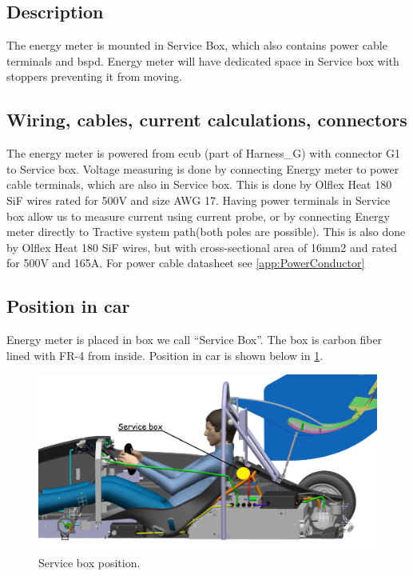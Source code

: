 \subsection{Description}

The energy meter is mounted in Service Box, which also contains power cable terminals and \gls{bspd}. Energy meter will have dedicated space in Service box with stoppers preventing it from moving. 

\subsection{Wiring, cables, current calculations, connectors}

The energy meter is powered from \gls{ecub} (part of Harness\_G) with connector G1 to Service box. Voltage measuring is done by connecting Energy meter to power cable terminals, which are also in Service box. This is done by Olflex Heat 180 SiF wires rated for 500V and size AWG 17. Having power terminals in Service box allow us to measure current using current probe, or by connecting Energy meter directly to Tractive system path(both poles are possible). This is also done by Olflex Heat 180 SiF wires, but with cross-sectional area of 16mm2 and rated for 500V and 165A. For power cable datasheet see \ref{app:PowerConductor}

\subsection{Position in car}

Energy meter is placed in box we call “Service Box”. The box is carbon fiber lined with FR-4 from inside. Position in car is shown below in \ref{fig:ServiceBox-position}.

\begin{figure}[H]
	\centering
	\includegraphics[width=\textwidth]{./img/ServiceBox-position.jpg}
	\caption{Service box position.}
	\label{fig:ServiceBox-position}
\end{figure}





